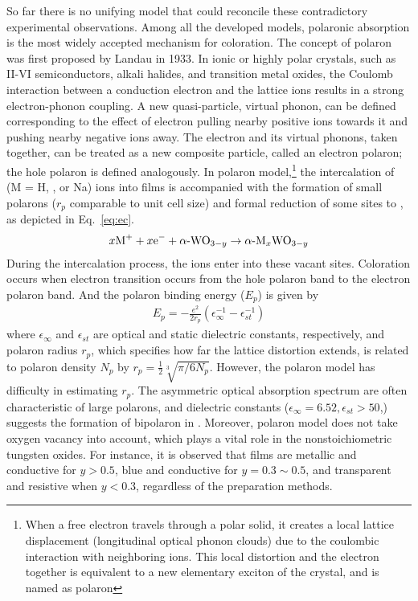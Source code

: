 So far there is no unifying model that could reconcile these contradictory experimental observations. Among all the developed models, polaronic absorption is the most widely accepted mechanism for coloration. The concept of polaron was first proposed by Landau in 1933. In ionic or highly polar crystals, such as II-VI semiconductors, alkali halides, and transition metal oxides, the Coulomb interaction between a conduction electron and the lattice ions results in a strong electron-phonon coupling. A new quasi-particle, virtual phonon, can be defined corresponding to the effect of electron pulling nearby positive ions towards it and pushing nearby negative ions away. The electron and its virtual phonons, taken together, can be treated as a new composite particle, called an electron polaron; the hole polaron is defined analogously.\cite{Devreese1996} In polaron model,\footnote{When a free electron travels through a polar solid, it creates a local lattice displacement (longitudinal optical phonon clouds) due to the coulombic interaction with neighboring ions. This local distortion and the electron together is equivalent to a new elementary exciton of the crystal, and is named as polaron} the intercalation of  (M = H, , or Na) ions into  films is accompanied with the formation of small polarons ($r_p$ comparable to unit cell size) and formal reduction of some  sites to , as depicted in Eq.~\ref{eq:ec}. 
\begin{align}\label{eq:ec}
x\ce{M+} + x\ce{e-} +  \ce{$\alpha \hyphen$WO$_{3-y}$} \rightarrow \ce{$\alpha \hyphen$M$_x$WO$_{3-y}$}
\end{align}
During the intercalation process, the  ions enter into these vacant sites.\cite{Hepel2008} Coloration occurs when electron transition occurs from the hole polaron band to the electron polaron band. And the polaron binding energy ($E_p$) is given by
\begin{align}
E_p = - \frac{e^2}{2r_p} (\epsilon_\infty^{-1} - \epsilon_{st}^{-1})
\end{align}
where $\epsilon_\infty$ and $\epsilon_{st}$ are optical and static dielectric constants, respectively, and polaron radius $r_p$, which specifies how far the lattice distortion extends, is related to polaron density $N_p$ by $r_p = \frac{1}{2}\sqrt[3]{\pi/6N_p}$. However, the polaron model has difficulty in estimating $r_p$. The asymmetric optical absorption spectrum are often characteristic of large polarons, and dielectric constants ($\epsilon_\infty = 6.52,\epsilon_{st} > 50$,\cite{Deb2008}) suggests the formation of bipolaron in . Moreover, polaron model does not take oxygen vacancy into account, which plays a vital role in the nonstoichiometric tungsten oxides. For instance, it is observed that  films are metallic and conductive for $y > 0.5$, blue and conductive for $y = 0.3 \sim 0.5$, and transparent and resistive when $y < 0.3$, regardless of the preparation methods.\cite{Chatten2005}

